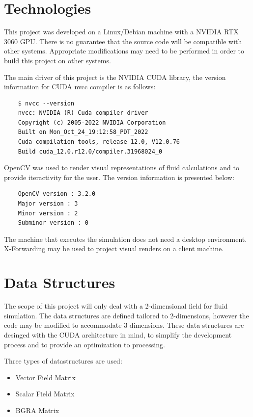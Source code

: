 \documentclass[
10pt, %
letterpaper, %
oneside, %
headinclude,footinclude, %
BCOR5mm, %
]{scrartcl}
\begin{document}
\pagebreak
\section{Technologies} %
This project was developed on a Linux/Debian machine with a NVIDIA RTX 3060 GPU. There is no guarantee that the source code will be compatible
with other systems. Appropriate modifications may need to be performed in order to build this project on other systems.

The main driver of this project is the NVIDIA CUDA library, the version information for CUDA nvcc compiler is as follows:
\begin{verbatim}
    $ nvcc --version
    nvcc: NVIDIA (R) Cuda compiler driver
    Copyright (c) 2005-2022 NVIDIA Corporation
    Built on Mon_Oct_24_19:12:58_PDT_2022
    Cuda compilation tools, release 12.0, V12.0.76
    Build cuda_12.0.r12.0/compiler.31968024_0
\end{verbatim}

OpenCV was used to render visual representations of fluid calculations and to provide iteractivity for the user. The version information is
presented below:

\begin{verbatim}
    OpenCV version : 3.2.0
    Major version : 3
    Minor version : 2
    Subminor version : 0
\end{verbatim}

The machine that executes the simulation does not need a desktop environment. X-Forwarding may be used to project visual renders on a client
machine.

\section{Data Structures} %
The scope of this project will only deal with a 2-dimensional field for fluid simulation. The data structures are defined tailored to 2-dimensions,
however the code may be modified to accommodate 3-dimensions. These data structures are desinged with the CUDA architecture in mind, to simplify
the development process and to provide an optimization to processing.

Three types of datastructures are used:
\begin{itemize}
    \item Vector Field Matrix
    \item Scalar Field Matrix
    \item BGRA Matrix
\end{itemize}
\end{document}
